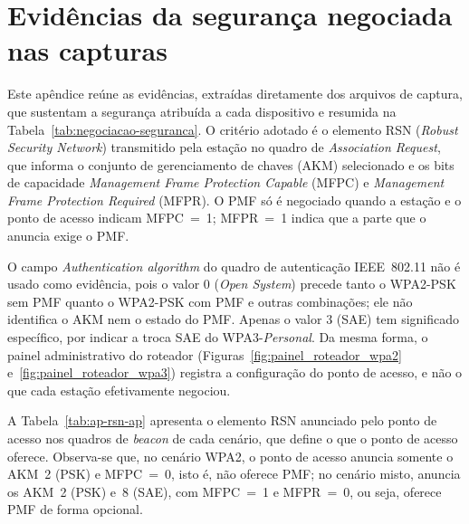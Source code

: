
\chapter{Evidências da segurança negociada nas capturas}
\label{sec:evidencias-rsn}

Este apêndice reúne as evidências, extraídas diretamente dos arquivos de captura, que sustentam a segurança atribuída a cada dispositivo e resumida na Tabela~\ref{tab:negociacao-seguranca}. O critério adotado é o elemento RSN (\textit{Robust Security Network}) transmitido pela estação no quadro de \textit{Association Request}, que informa o conjunto de gerenciamento de chaves (AKM) selecionado e os bits de capacidade \textit{Management Frame Protection Capable} (MFPC) e \textit{Management Frame Protection Required} (MFPR). O PMF só é negociado quando a estação e o ponto de acesso indicam MFPC~=~1; MFPR~=~1 indica que a parte que o anuncia exige o PMF.

O campo \textit{Authentication algorithm} do quadro de autenticação IEEE~802.11 não é usado como evidência, pois o valor 0 (\textit{Open System}) precede tanto o WPA2-PSK sem PMF quanto o WPA2-PSK com PMF e outras combinações; ele não identifica o AKM nem o estado do PMF. Apenas o valor 3 (SAE) tem significado específico, por indicar a troca SAE do WPA3-\textit{Personal}. Da mesma forma, o painel administrativo do roteador (Figuras~\ref{fig:painel_roteador_wpa2} e~\ref{fig:painel_roteador_wpa3}) registra a configuração do ponto de acesso, e não o que cada estação efetivamente negociou.

A Tabela~\ref{tab:ap-rsn-ap} apresenta o elemento RSN anunciado pelo ponto de acesso nos quadros de \textit{beacon} de cada cenário, que define o que o ponto de acesso oferece. Observa-se que, no cenário WPA2, o ponto de acesso anuncia somente o AKM~2 (PSK) e MFPC~=~0, isto é, não oferece PMF; no cenário misto, anuncia os AKM~2 (PSK) e~8 (SAE), com MFPC~=~1 e MFPR~=~0, ou seja, oferece PMF de forma opcional.

